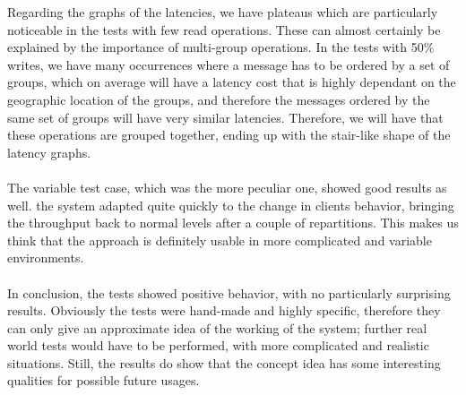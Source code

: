 Regarding the graphs of the latencies, we have plateaus which are particularly noticeable in the tests with few read operations. These can almost certainly be explained by the importance of multi-group operations. In the tests with 50\% writes, we have many occurrences where a message has to be ordered by a set of groups, which on average will have a latency cost that is highly dependant on the geographic location of the groups, and therefore the messages ordered by the same set of groups will have very similar latencies. Therefore, we will have that these operations are grouped together, ending up with the stair-like shape of the latency graphs. 
\\\\
The variable test case, which was the more peculiar one, showed good results as well. the system adapted quite quickly to the change in clients behavior, bringing the throughput back to normal levels after a couple of repartitions. This makes us think that the approach is definitely usable in more complicated and variable environments.
\\\\
In conclusion, the tests showed positive behavior, with no particularly surprising results. Obviously the tests were hand-made and highly specific, therefore they can only give an approximate idea of the working of the system; further real world tests would have to be performed, with more complicated and realistic situations. Still, the results do show that the concept idea has some interesting qualities for possible future usages.


